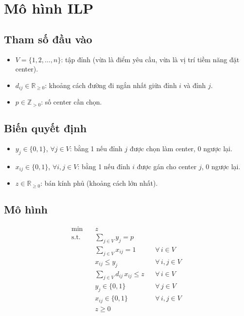 \documentclass[11pt,a4paper]{article}
\begin{document}
\section{Mô hình ILP}
\label{sec:ilp}

\subsection{Tham số đầu vào}

\begin{itemize}[nosep]
    \item $V = \{1, 2, \dots, n\}$: tập đỉnh (vừa là điểm yêu cầu, vừa là vị trí tiềm năng đặt center).
    \item $d_{ij} \in \mathbb{R}_{\ge 0}$: khoảng cách đường đi ngắn nhất giữa đỉnh $i$ và đỉnh $j$.
    \item $p \in \mathbb{Z}_{>0}$: số center cần chọn.
\end{itemize}

\subsection{Biến quyết định}

\begin{itemize}[nosep]
    \item $y_j \in \{0, 1\}$, $\forall j \in V$: bằng 1 nếu đỉnh $j$ được chọn làm center, 0 ngược lại.
    \item $x_{ij} \in \{0, 1\}$, $\forall i, j \in V$: bằng 1 nếu đỉnh $i$ được gán cho center $j$, 0 ngược lại.
    \item $z \in \mathbb{R}_{\ge 0}$: bán kính phủ (khoảng cách lớn nhất).
\end{itemize}

\subsection{Mô hình}

\begin{align}
    \min \quad & z \label{eq:obj} \\[4pt]
    \text{s.t.} \quad
    & \sum_{j \in V} y_j = p \label{eq:cardinality} \\[4pt]
    & \sum_{j \in V} x_{ij} = 1 && \forall\, i \in V \label{eq:assign} \\[4pt]
    & x_{ij} \le y_j && \forall\, i, j \in V \label{eq:link} \\[4pt]
    & \sum_{j \in V} d_{ij}\, x_{ij} \le z && \forall\, i \in V \label{eq:dist} \\[4pt]
    & y_j \in \{0, 1\} && \forall\, j \in V \label{eq:binary_y} \\[4pt]
    & x_{ij} \in \{0, 1\} && \forall\, i, j \in V \label{eq:binary_x} \\[4pt]
    & z \ge 0 \label{eq:nonneg}
\end{align}
\end{document}
